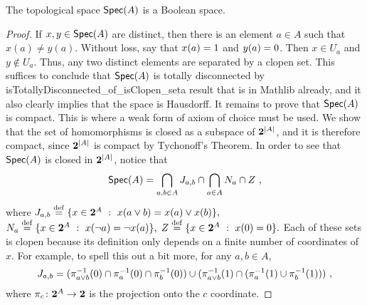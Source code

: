 \begin{theorem}
    The topological space $\operatorname*{\mathsf{Spec}}(A)$ is a Boolean space.
\end{theorem}
\begin{proof}
    If $x, y \in \operatorname*{\mathsf{Spec}}(A)$ are distinct, then there is an element $a \in A$
    such that $x(a) \neq y(a)$. Without loss, say that $x(a) = 1$ and $y(a)
    = 0$. Then $x \in U_a$ and $y \not\in U_a$. Thus, any two distinct
    elements are separated by a clopen set. This suffices to conclude that
    $\operatorname*{\mathsf{Spec}}(A)$ is totally disconnected by
    {isTotallyDisconnected_of_isClopen_set}{a result that is in Mathlib
    already}, and it also clearly implies that the space is Hausdorff. It
    remains to prove that $\operatorname*{\mathsf{Spec}}(A)$ is compact. This is where a weak form of
    axiom of choice must be used. We show that the set of homomorphisms is
    closed as a subspace of $\mathbf{2}^{|A|}$, and it is therefore compact, since
    $\mathbf{2}^{|A|}$ is compact by Tychonoff's Theorem. In order to see that
    $\operatorname*{\mathsf{Spec}}(A)$ is closed in $\mathbf{2}^{|A|}$, notice that \[ \Spec(A) =
    \bigcap_{a,b\in A} J_{a,b} \cap \bigcap_{a \in A} N_a \cap Z \ , \]
    where $J_{a,b} \stackrel{\mathrm{def}}{=} \{ x \in \mathbf{2}^A \ : \ x(a \vee b) = x(a) \vee x(b)
    \},$ $N_a \stackrel{\mathrm{def}}{=}  \{x \in \mathbf{2}^A \ : \ x(\neg a) = \neg x(a) \},$ $Z
    \stackrel{\mathrm{def}}{=} \{ x \in \mathbf{2}^A \ : \ x(0) = 0\}.$ Each of these sets is
    clopen because its definition only depends on a finite number of
    coordinates of $x$. For example, to spell this out a bit more, for any $a,
    b \in A$,
    \[ J_{a,b} = 
        (\pi_{a \vee b}^{-1}(0) \cap \pi_{a}^{-1}(0) \cap
        \pi_{b}^{-1}(0)) \cup (\pi_{a \vee b}^{-1}(1) \cap
    (\pi_a^{-1}(1) \cup \pi_b^{-1}(1))) \ , \]
    where $\pi_c \colon \mathbf{2}^A \to \mathbf{2}$ is the projection onto the $c$
    coordinate.\qedhere

\end{proof}
